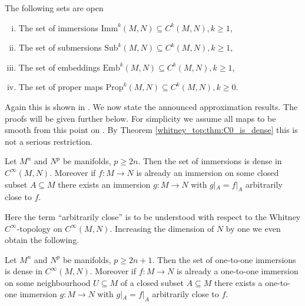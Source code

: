 \begin{theorem}
    \label{whitney_top:thm:open_sets}
    The following sets are open
    \begin{enumerate}[(i)]
        \item The set of immersions $\mathrm{Imm}^k(M,N) \subseteq C^k(M,N), k \geq 1$,
        \item The set of submersions $\mathrm{Sub}^k(M,N) \subseteq C^k(M,N), k \geq 1$,
        \item The set of embeddings $\mathrm{Emb}^k(M,N) \subseteq C^k(M,N), k \geq 1$,
        \item The set of proper maps $\mathrm{Prop}^k(M,N) \subseteq C^k(M,N), k \geq 0$.
    \end{enumerate}
\end{theorem}

Again this is shown in \cite{hirsch2012differential}. We now state the announced approximation results. The proofs will be given further below. For simplicity we assume all maps to be smooth from this point on \footnotemark. By Theorem \ref{whitney_top:thm:C0_is_dense} this is not a serious restriction.  


\begin{theorem}[Immersions]
    \label{whitney_top:thm:approx_immersions}
    Let $M^n$ and $N^p$ be manifolds, $p \geq 2n$. Then the set of immersions is dense in $C^\infty(M,N)$. Moreover if $f \colon M \to N$ is already an immersion on some closed subset $A \subseteq M$ there exists an immersion $g \colon M \to N$ with $g|_A = f|_A$ arbitrarily close to $f$.
\end{theorem}

\needspace{5em}

Here the term ``arbitrarily close'' is to be understood with respect to the Whitney $C^\infty$-topology on $C^\infty(M,N)$. Increasing the dimension of $N$ by one we even obtain the following.

\begin{theorem}
     \label{whitney_top:thm:approx_one_to_one_immersions}
    Let $M^n$ and $N^p$ be manifolds, $p \geq 2n + 1$. Then the set of one-to-one immersions is dense in $C^\infty(M,N)$. Moreover if $f \colon M \to N$ is already a one-to-one immersion on some neighbourhood $U \subseteq M$ of a closed subset $A \subseteq M$ there exists a one-to-one immersion $g \colon M \to N$ with $g|_A = f|_A$ arbitrarily close to $f$.
\end{theorem}

